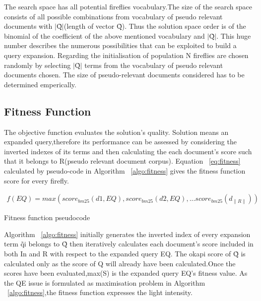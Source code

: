 \documentclass{nitk}
\begin{document}
The search space has all potential fireflies vocabulary.The size of the search space consists of all possible combinations from vocabulary of pseudo relevant documents with $|$\~{Q}$|$(length of vector \~{Q}). Thus the solution space order is of the binomial of the coefficient of the above mentioned vocabulary and $|$\~{Q}$|$. This huge number describes the numerous possibilities that can be exploited to build a query expansion. Regarding the initialisation of population N fireflies are chosen randomly by selecting $|$\~{Q}$|$ terms from the vocabulary of pseudo relevant documents chosen.
The size of pseudo-relevant documents considered has to be determined emperically. 
\subsection{Fitness Function}
The objective function evaluates the solution's quality. Solution means an expanded query,therefore its performance can be assessed by considering the inverted indexes of its terms and then calculating the each document's score such that it belongs to R(pseudo relevant document corpus).
Equation ~\ref{eq:fitness} calculated by pseudo-code in Algorithm ~\ref{algo:fitness} gives the fitness function score for every firefly. 

\begin{equation}
\label{eq:fitness}
\begin{aligned}
f(EQ) = max(score_{bm25}(d1,EQ),score_{bm25}(d2,EQ),...score_{bm25}(d_{\|R\|}))
\end{aligned}
\end{equation}
\begin{algorithm}
\caption{Fitness function pseudocode}
\label{algo:fitness}

\end{algorithm}
Algorithm ~\ref{algo:fitness} initially generates the inverted index of every expansion term \~{qi} belongs to \~{Q} then iteratively calculates each document's score  included in both In and R with respect to the expanded query EQ. The okapi score of \~{Q} is calculated only as the score of Q will already have been calculated.Once the scores have been evaluated,max(S) is the expanded query EQ's fitness value.
As the QE issue is formulated as maximisation problem in Algorithm ~\ref{algo:fitness},the fitness function expresses the light intensity. 
\end{document}
